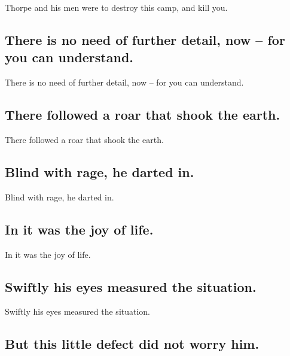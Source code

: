 \documentclass[]{article}
\begin{document}
Thorpe and his men were to destroy this camp, and kill you.

\hypertarget{there-is-no-need-of-further-detail-now-for-you-can-understand.}{%
\subsection{There is no need of further detail, now -- for you can
understand.}\label{there-is-no-need-of-further-detail-now-for-you-can-understand.}}

There is no need of further detail, now -- for you can understand.

\hypertarget{there-followed-a-roar-that-shook-the-earth.}{%
\subsection{There followed a roar that shook the
earth.}\label{there-followed-a-roar-that-shook-the-earth.}}

There followed a roar that shook the earth.

\hypertarget{blind-with-rage-he-darted-in.}{%
\subsection{Blind with rage, he darted
in.}\label{blind-with-rage-he-darted-in.}}

Blind with rage, he darted in.

\hypertarget{in-it-was-the-joy-of-life.}{%
\subsection{In it was the joy of
life.}\label{in-it-was-the-joy-of-life.}}

In it was the joy of life.

\hypertarget{swiftly-his-eyes-measured-the-situation.}{%
\subsection{Swiftly his eyes measured the
situation.}\label{swiftly-his-eyes-measured-the-situation.}}

Swiftly his eyes measured the situation.

\hypertarget{but-this-little-defect-did-not-worry-him.}{%
\subsection{But this little defect did not worry
him.}\label{but-this-little-defect-did-not-worry-him.}}
\end{document}
